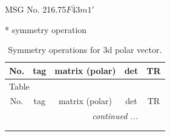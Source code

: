 \documentclass[fleqn,8pt]{jsarticle}
\begin{document}
\setcounter{MaxMatrixCols}{32}

\renewcommand{\tablename}{Table~}
\renewcommand{\figurename}{Figure~}
\begin{center}
\LARGE
MSG No. 216.75\quad$F\bar{4}3m1'$
\end{center}
* symmetry operation
\renewcommand{\arraystretch}{1.3}
\begin{longtable}{ccccc}
\caption{Symmetry operations for 3d polar vector.}
 \\
 \hline \hline
No. & tag & matrix (polar) & det & TR \\ \hline \endfirsthead

\multicolumn{4}{l}{\tablename\ \thetable{}} \\
 \hline \hline
No. & tag & matrix (polar) & det & TR \\ \hline \endhead

 \hline \hline
\multicolumn{4}{r}{\footnotesize\it continued ...} \\ \endfoot

 \hline \hline
\multicolumn{4}{r}{} \\ \endlastfoot


\end{longtable}
\end{document}
